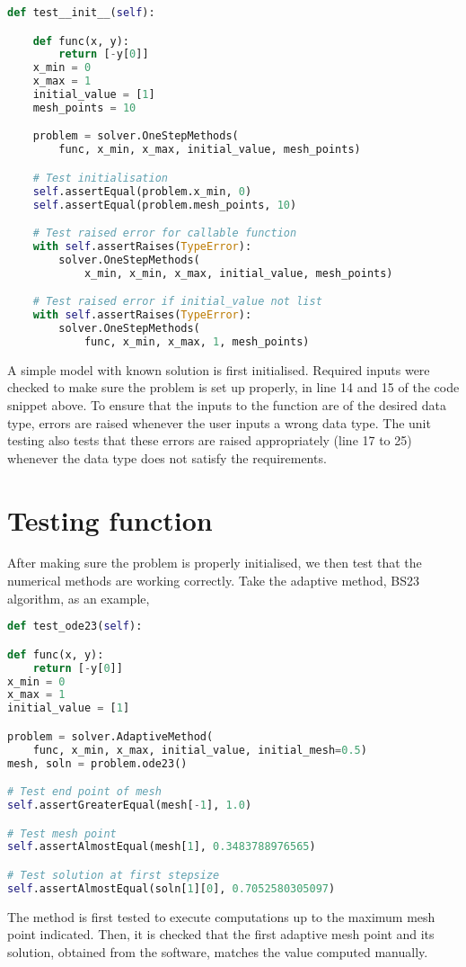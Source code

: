 \begin{lstlisting}[language=Python, caption= {initialisation testing}, title={Testing initialisation of problem}, label={code:test_init}]
def test__init__(self):

    def func(x, y):
        return [-y[0]]
    x_min = 0
    x_max = 1
    initial_value = [1]
    mesh_points = 10

    problem = solver.OneStepMethods(
        func, x_min, x_max, initial_value, mesh_points)

    # Test initialisation
    self.assertEqual(problem.x_min, 0)
    self.assertEqual(problem.mesh_points, 10)

    # Test raised error for callable function
    with self.assertRaises(TypeError):
        solver.OneStepMethods(
            x_min, x_min, x_max, initial_value, mesh_points)

    # Test raised error if initial_value not list
    with self.assertRaises(TypeError):
        solver.OneStepMethods(
            func, x_min, x_max, 1, mesh_points)
\end{lstlisting}
A simple model with known solution is first initialised. Required inputs were checked to make sure the problem is set up properly, in line 14 and 15 of the code snippet above. To ensure that the inputs to the function are of the desired data type, errors are raised whenever the user inputs a wrong data type. The unit testing also tests that these errors are raised appropriately (line 17 to 25) whenever the data type does not satisfy the requirements. 

\section{Testing function}
\label{sec:test_func}
After making sure the problem is properly initialised, we then test that the numerical methods are working correctly. Take the adaptive method, BS23 algorithm, as an example, 
\begin{lstlisting}[language=Python, caption= {testing of function}, title={Testing execution of method}, label={code:test_func}]
def test_ode23(self):

def func(x, y):
    return [-y[0]]
x_min = 0
x_max = 1
initial_value = [1]

problem = solver.AdaptiveMethod(
    func, x_min, x_max, initial_value, initial_mesh=0.5)
mesh, soln = problem.ode23()

# Test end point of mesh
self.assertGreaterEqual(mesh[-1], 1.0)

# Test mesh point
self.assertAlmostEqual(mesh[1], 0.3483788976565)

# Test solution at first stepsize
self.assertAlmostEqual(soln[1][0], 0.7052580305097)
\end{lstlisting}
The method is first tested to execute computations up to the maximum mesh point indicated. Then, it is checked that the first adaptive mesh point and its solution, obtained from the software, matches the value computed manually. 

